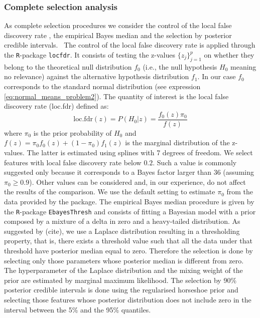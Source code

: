 \documentclass[american,]{article}
\theoremstyle{definition}
\begin{document}
\hypertarget{complete-selection}{%
\subsubsection{Complete selection analysis}\label{complete-selection}}
As complete selection procedures we consider the control of the local false discovery rate \citep{paper:efron, efron2012large}, the empirical Bayes median \citep{johnstone2004needles} and the selection by posterior credible intervals. 
\
The control of the local false discovery rate is applied through the \texttt{R}-package \texttt{locfdr}. It consists of testing the z-values $\{z_{j}\}_{j=1}^{p}$ on whether they belong to the theoretical null distribution $f_{0}$ (i.e., the null hypothesis $H_0$ meaning no relevance) against the alternative hypothesis distribution $f_{1}$. In our case $f_{0}$ corresponds to the standard normal distribution (see expression \eqref{eq:normal_means_problem2}). The quantity of interest is the local false discovery rate (loc.fdr) defined as:
\
\begin{equation}
\text{loc.fdr}(z)=P(H_{0}|z)=\frac{f_{0}(z)\pi_{0}}{f(z)}
\end{equation}
where $\pi_{0}$ is the prior probability of $H_0$ and $f(z)=\pi_{0}f_{0}(z)+(1-\pi_{0})f_{1}(z)$ is the marginal distribution of the z-values. The latter is estimated using splines with 7 degrees of freedom. We select features with local false discovery rate below $0.2$. Such a value is commonly suggested only because it corresponds to a Bayes factor larger than 36 (assuming $\pi_{0}\geq0.9$). Other values can be considered and, in our experience, do not affect the results of the comparison. We use the default setting to estimate $\pi_{0}$ from the data provided by the package.
The empirical Bayes median procedure is given by the \texttt{R}-package \texttt{EbayesThresh} and consists of fitting a Bayesian model with a prior composed by a mixture of a delta in zero and a heavy-tailed distribution. As suggested by (cite), we use a Laplace distribution resulting in a thresholding property, that is, there exists a threshold value such that all the data under that threshold have posterior median equal to zero. Therefore the selection is done by selecting only those parameters whose posterior median is different from zero. The hyperparameter of the Laplace distribution and the mixing weight of the prior are estimated by marginal maximum likelihood. 
The selection by 90\% posterior credible intervals is done using the regularised horseshoe prior and selecting those features whose posterior distribution does not include zero in the interval between the 5\% and the 95\% quantiles.
\end{document}
